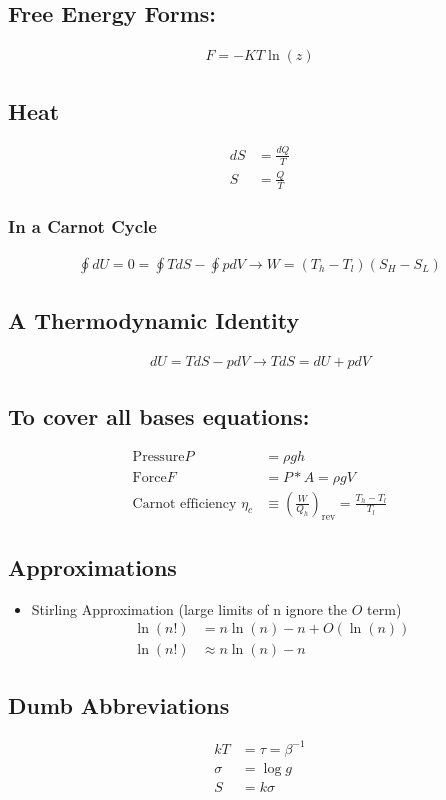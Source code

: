 \subsection*{Free Energy Forms:}
\begin{align}
	F = - KT \ln(z)
\end{align}

\subsection*{Heat}
\begin{align}
	dS & = \frac{dQ}{T} \\
	S  & = \frac{Q}{T}
\end{align}

\subsubsection*{In a Carnot Cycle}
\begin{align}
	\oint dU = 0 = \oint TdS - \oint pdV \rightarrow W = (T_h - T_l) (S_H - S_L)
\end{align}

\subsection*{A Thermodynamic Identity}
\begin{align}
	dU = TdS -pdV \rightarrow	TdS = dU + p dV
\end{align}

\subsection*{To cover all bases equations:}
\begin{align}
	\text{Pressure} P                & = \rho g h                                                \\
	\text{Force} F                   & = P * A = \rho g V                                        \\
	\text{Carnot efficiency } \eta_c & \equiv (\frac{W}{Q_h})_\text{rev} = \frac{T_h - T_l}{T_l}
\end{align}

\subsection*{Approximations}

\begin{itemize}
	\item Stirling Approximation (large limits of n ignore the $O$ term)
	      \begin{align*}
		      \ln(n!) & = n \ln(n) - n + O(\ln(n)) \\
		      \ln(n!) & \approx n \ln(n) - n
	      \end{align*}
\end{itemize}


\subsection*{Dumb Abbreviations}
\begin{align*}
	k T    & = \tau  = \beta^{-1} \\
	\sigma & = \log g             \\
	S      & = k \sigma
\end{align*}
